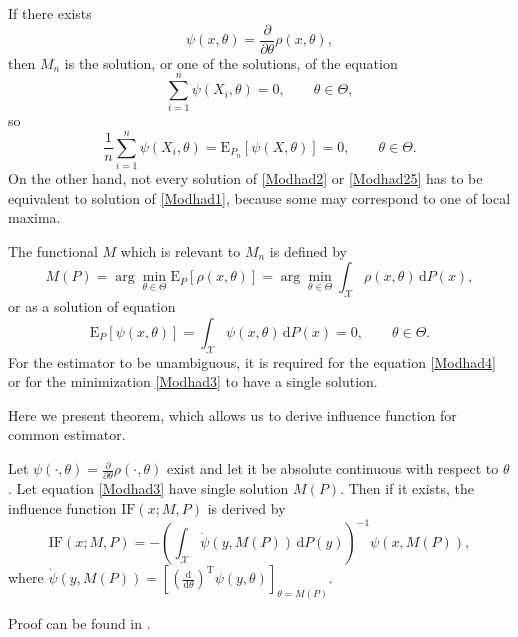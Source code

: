 If there exists
\begin{equation}
	\psi(x,\theta) = \frac{\partial}{\partial \theta} \rho(x,\theta), 
\end{equation}
then $M_n$ is the solution, or one of the solutions, of the equation 
\begin{equation}
	\sum_{i=1}^n \psi(X_i,\theta) = 0, \qquad \theta \in \Theta,
	\label{Modhad2}
\end{equation}
so 
\begin{equation}
	\frac{1}{n}\sum_{i=1}^n \psi(X_i,\theta) = \mathrm{E}_{P_n}\left[ \psi(X,\theta) \right] = 0, \qquad \theta \in \Theta.
	\label{Modhad25}
\end{equation}
On the other hand, not every solution of \ref{Modhad2} or \ref{Modhad25} has to be equivalent to solution of \ref{Modhad1}, because some may correspond to one of local maxima.

The functional $M$ which is relevant to $M_n$ is defined by 
\begin{equation}
	M(P) = \arg \min_{\theta \in \Theta} \mathrm{E}_{P}\left[ \rho(x,\theta) \right] = \arg \min_{\theta \in \Theta} \int_\mathcal{X} \rho(x,\theta) \, \mathrm{d}P(x),
	\label{Modhad3}
\end{equation}
or as a solution of equation 
\begin{equation}
\mathrm{E}_{P}\left[ \psi(x,\theta) \right] =  \int_\mathcal{X} \psi(x,\theta) \, \mathrm{d}P(x) = 0, \qquad \theta \in \Theta.
\label{Modhad4}
\end{equation}
For the estimator to be unambiguous, it is required for the equation \ref{Modhad4} or for the minimization \ref{Modhad3} to have a single solution.

Here we present theorem, which allows us to derive influence function for common \ren estimator.
\begin{theorem} 
Let $\psi(\cdot,\theta) =  \frac{\partial}{\partial \theta} \rho(\cdot,\theta)$ exist and let it be absolute continuous with respect to $\theta$. Let equation \eqref{Modhad3} have single solution $M(P)$. Then if it exists, the influence function $\mathrm{IF}(x;M,P)$ is derived by
\begin{equation}
 \text{IF}(x;M,P) = -\left(\int_{\mathcal{X}} \dot{\psi} (y,M(P)) \, \mathrm{d}P(y)\right)^{-1} \psi(x,M(P)),
\end{equation}
where $\dot{\psi} (y,M(P)) = \left[\left(\frac{\mathrm{d}}{\mathrm{d}\theta}\right)^\mathrm{T}\psi(y,\theta)\right]_{\theta = M(P)}$.
\label{theo:IF}
\end{theorem}
\noindent Proof can be found in \cite{Demut2010}.

